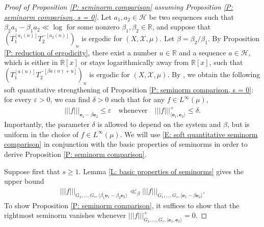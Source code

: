 \documentclass[11pt]{amsart}
\theoremstyle{definition}
\newcommand{\R}{{\mathbb R}}
\newcommand{\Z}{{\mathbb Z}}
\newcommand{\CH}{{\mathcal H}}
\newcommand{\CX}{{\mathcal X}}
\newcommand{\be}{{\mathbf{e}}}
\newcommand{\veps}{\varepsilon}
\newcommand{\nnorm}[1]{\lvert\!|\!| #1|\!|\!\rvert}
\newcommand{\1}{{\mathbf{1}}}
\newcommand{\floor}[1]{{\left \lfloor #1 \right \rfloor}}
\begin{document}
\begin{proof}[Proof of Proposition \ref{P: seminorm comparison} assuming Proposition \ref{P: seminorm comparison, s = 0}]

Let $a_1, a_2\in\CH$ be two sequences such that $\beta_2 a_1 - \beta_1 a_2 \ll \log$ for some nonzero $\beta_1, \beta_2\in\R$, and suppose that $(T_1^{\floor{a_1(n)}}T_2^{-\floor{a_2(n)}})_n$ is ergodic for $(X, \CX, \mu)$. Let $\beta = \beta_2/\beta_1$. By Proposition \ref{P: reduction of ergodicity}, there exist a number $u\in\R$ and a sequence $a\in\CH$, which is either in $\R[x]$ or stays logarithmically away from $\R[x]$, such that $(T_1^{\floor{a(n)}}T_2^{-\floor{\beta a(n)+u}})_n$ is ergodic for $(X, \CX, \mu)$. By \cite[Proposition A.2]{FrKu22a}, we obtain the following soft quantitative strengthening of Proposition \ref{P: seminorm comparison, s = 0}: for every $\veps>0$, we can find $\delta>0$ such that for any $f\in L^\infty(\mu)$,
\begin{align}\label{E: soft quantitative seminorm comparison}
    \nnorm{f}_{\be_1 - \beta \be_2} \leq \veps \quad \textrm{whenever} \quad \nnorm{f}_{\langle \be_1, \be_2\rangle}^+\leq \delta.
\end{align}
Importantly, the parameter $\delta$ is allowed to depend on the system and $\beta$, but is uniform in the choice of $f\in L^\infty(\mu)$. We will use \eqref{E: soft quantitative seminorm comparison} in conjunction with the basic properties of seminorms in order to derive Proposition \ref{P: seminorm comparison}.

 
Suppose first that $s\geq 1$. Lemma \ref{L: basic properties of seminorms} gives the upper bound 
\begin{align*}
    \nnorm{f}_{G_1, \ldots, G_s, \langle\beta_1 \be_1 - \beta_2 \be_2\rangle}\ll_{\beta} \nnorm{f}_{G_1, \ldots, G_s, \langle \be_1 - \beta \be_2\rangle}.
\end{align*}
To show Proposition \ref{P: seminorm comparison}, it suffices to show that the rightmost seminorm vanishes whenever $\nnorm{f}_{G_1, \ldots, G_s, \langle\be_1, \be_2\rangle}^+ = 0.$


\end{proof}
\end{document}
